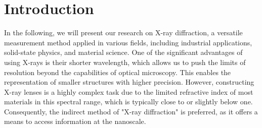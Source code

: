 

\chapter{Introduction}
\label{chap:einleitung}

In the following, we will present our research on X-ray diffraction, a versatile measurement method applied in various fields, including industrial applications, solid-state physics, and material science. One of the significant advantages of using X-rays is their shorter wavelength, which allows us to push the limits of resolution beyond the capabilities of optical microscopy. This enables the representation of smaller structures with higher precision. However, constructing X-ray lenses is a highly complex task due to the limited refractive index of most materials in this spectral range, which is typically close to or slightly below one. Consequently, the indirect method of "X-ray diffraction" is preferred, as it offers a means to access information at the nanoscale.

